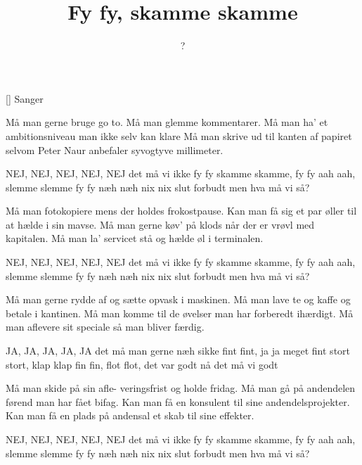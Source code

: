 \documentclass[a4paper,11pt]{article}
\title{Fy fy, skamme skamme}
\author{?}
\begin{document}
\maketitle

\begin{roles}
[] Sanger
\end{roles}

\begin{song}
     Må man gerne bruge go to.
              Må man glemme kommentarer.
              Må man ha' et ambitionsniveau
              man ikke selv kan klare
              Må man skrive ud til kanten
              af papiret selvom Peter
              Naur anbefaler
              syvogtyve millimeter.

     NEJ, NEJ, NEJ, NEJ, NEJ
              det må vi ikke
              fy fy skamme skamme, fy fy aah aah,
              slemme slemme fy fy
              næh næh nix nix slut forbudt
              men hva må vi så?

     Må man fotokopiere mens
              der holdes frokostpause.
              Kan man få sig et par øller
              til at hælde i sin mavse.
              Må man gerne køv' på klods
              når der er vrøvl med kapitalen.
              Må man la' servicet stå
              og hælde øl i terminalen.

     NEJ, NEJ, NEJ, NEJ, NEJ
              det må vi ikke
              fy fy skamme skamme, fy fy aah aah,
              slemme slemme fy fy
              næh næh nix nix slut forbudt
              men hva må vi så?

     Må man gerne rydde af og
              sætte opvask i maskinen.
              Må man lave te og kaffe og
              betale i kantinen.
              Må man komme til de øvelser
              man har forberedt ihærdigt.
              Må man aflevere sit speciale
              så man bliver færdig.

     JA, JA, JA, JA, JA
              det må man gerne
              næh sikke fint fint, ja ja meget fint
              stort stort, klap klap
              fin fin, flot flot, det var godt
              nå det må vi godt

     Må man skide på sin afle-
              veringsfrist og holde fridag.
              Må man gå på andendelen
              førend man har fået bifag.
              Kan man få en konsulent
              til sine andendelsprojekter.
              Kan man få en plads på andensal
              et skab til sine effekter.

     NEJ, NEJ, NEJ, NEJ, NEJ
              det må vi ikke
              fy fy skamme skamme, fy fy aah aah,
              slemme slemme fy fy
              næh næh nix nix slut forbudt
              men hva må vi så?
\end{song}
\end{document}

